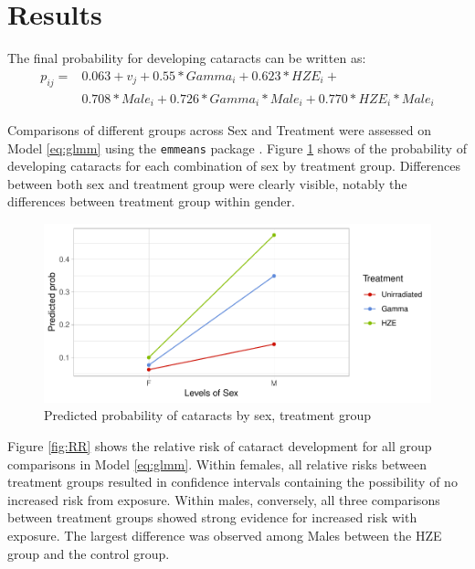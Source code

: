 \documentclass[12pt]{article}
\begin{document}
\section{Results}
\label{sec:results}

The final probability for developing cataracts can be written as:\\
\begin{equation}
\begin{aligned}
p_{ij} = &0.063 + v_j + 0.55*Gamma_i + 0.623*HZE_i + \\
&0.708*Male_i + 0.726*Gamma_i*Male_i + 0.770*HZE_i*Male_i
\end{aligned}
\label{eq:probs}
\end{equation}

Comparisons of different groups across Sex and Treatment were assessed on Model \eqref{eq:glmm} using the \texttt{emmeans} package \citep{R-emmeans}. Figure \ref{fig:contr} shows of the probability of developing cataracts for each combination of sex by treatment group. Differences between both sex and treatment group were clearly visible, notably the differences between treatment group within gender.

\begin{figure}[H]

{\centering \includegraphics{bookdown_report_files/figure-latex/contr-1} 

}

\caption{Predicted probability of cataracts by sex, treatment group}\label{fig:contr}
\end{figure}

Figure \ref{fig:RR} shows the relative risk of cataract development for all group comparisons in Model \eqref{eq:glmm}. Within females, all relative risks between treatment groups resulted in confidence intervals containing the possibility of no increased risk from exposure. Within males, conversely, all three comparisons between treatment groups showed strong evidence for increased risk with exposure. The largest difference was observed among Males between the HZE group and the control group.\\
\end{document}

